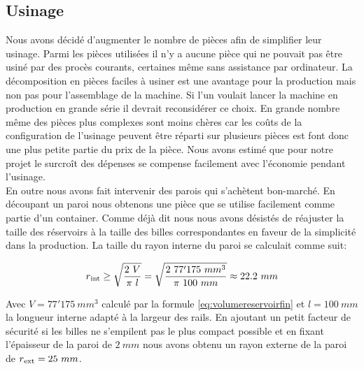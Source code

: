 \subsection{Usinage}
Nous avons décidé d'augmenter le nombre de pièces afin de simplifier leur usinage. Parmi les pièces utilisées il n'y a aucune pièce qui ne pouvait pas être usiné par des procès courants, certaines même sans assistance par ordinateur. La décomposition en pièces faciles à usiner est une avantage pour la production mais non pas pour l'assemblage de la machine. Si l'un voulait lancer la machine en production en grande série il devrait reconsidérer ce choix. En grande nombre même des pièces plus complexes sont moins chères car les coûts de la configuration de l'usinage peuvent être réparti sur plusieurs pièces est font donc une plus petite partie du prix de la pièce. Nous avons estimé que pour notre projet le surcroît des dépenses se compense facilement avec l'économie pendant l'usinage.\\

En outre nous avons fait intervenir des parois qui s'achètent bon-marché. En découpant un paroi nous obtenons une pièce que se utilise facilement comme partie d'un container. Comme déjà dit nous nous avons désistés de réajuster la taille des réservoirs à la taille des billes correspondantes en faveur de la simplicité dans la production. La taille du rayon interne du paroi se calculait comme suit: 

\begin{equation}r\textsubscript{int}\geq\sqrt{\frac{2\ V}{\pi\ l}}=\sqrt{\frac{2\ 77'175\ mm^3}{\pi\ 100\ mm}} \approx 22.2\ mm \label{eq:1}\end{equation}

Avec \(V=77'175\ mm^3\) calculé par la formule \ref{eq:volumereservoirfin} et \(l=100\ mm\) la longueur interne adapté à la largeur des rails. En ajoutant un petit facteur de sécurité si les billes ne s'empilent pas le plus compact possible et en fixant l'épaisseur de la paroi de \(2\ mm \) nous avons obtenu un rayon externe de la paroi de \(r\textsubscript{ext}=25\ mm\).
